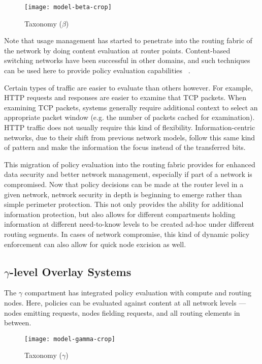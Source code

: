 \begin{figure}[!t]
\centering
\texttt{[image: model-beta-crop]}
\caption{Taxonomy ($\beta$)}
\label{fig:model:taxonomy-beta}
\end{figure}

Note that usage management has started to penetrate into the routing fabric of the network by doing content evaluation at router points.  Content-based switching networks have been successful in other domains, and such techniques can be used here to provide policy evaluation capabilities ~\cite{proposal:jboss-esb}.  

Certain types of traffic are easier to evaluate than others however.  For example, HTTP requests and responses are easier to examine that TCP packets.  When examining TCP packets, systems generally require additional context to select an appropriate packet window (e.g. the number of packets cached for examination).  HTTP traffic does not usually require this kind of flexibility.  Information-centric networks, due to their shift from previous network models, follow this same kind of pattern and make the information the focus instead of the transferred bits.

This migration of policy evaluation into the routing fabric provides for enhanced data security and better network management, especially if part of a network is compromised.  Now that policy decisions can be made at the router level in a given network, network security in depth is beginning to emerge rather than simple perimeter protection.  This not only provides the ability for additional information protection, but also allows for different compartments holding information at different need-to-know levels to be created ad-hoc under different routing segments.  In cases of network compromise, this kind of dynamic policy enforcement can also allow for quick node excision as well.

\subsection{$\gamma$-level Overlay Systems}
The $\gamma$ compartment has integrated policy evaluation with compute and routing nodes.  Here, policies can be evaluated against content at all network levels --- nodes emitting requests, nodes fielding requests, and all routing elements in between.

\begin{figure}[!t]
\centering
\texttt{[image: model-gamma-crop]}
\caption{Taxonomy ($\gamma$)}
\label{fig:model:taxonomy-gamma}
\end{figure}

